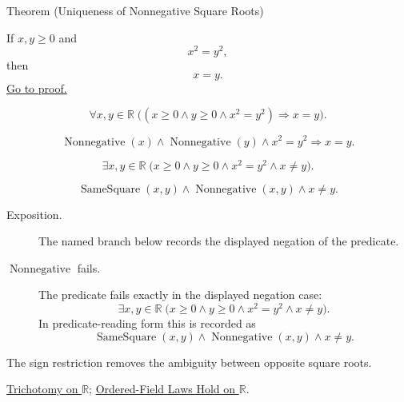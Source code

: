 \begin{theorembox}{Theorem (Uniqueness of Nonnegative Square Roots)}
\begin{theorem}
\label{thm:uniqueness-of-nonnegative-square-roots}
If $x,y\ge 0$ and
\[
x^2=y^2,
\]
then
\[
x=y.
\]
\hyperref[prf:uniqueness-of-nonnegative-square-roots]{Go to proof.}
\end{theorem}
\end{theorembox}
\begin{remark*}
\[
\forall x,y\in\mathbb{R}\;
\bigl((x\ge 0\land y\ge 0\land x^2=y^2)\Rightarrow x=y\bigr).
\]
\end{remark*}
\begin{remark*}
\[
\operatorname{Nonnegative}(x)\land\operatorname{Nonnegative}(y)\land x^2=y^2
\Rightarrow x=y.
\]
\end{remark*}
\begin{remark*}
\[
\exists x,y\in\mathbb{R}\;
\bigl(x\ge 0\land y\ge 0\land x^2=y^2\land x\ne y\bigr).
\]
\end{remark*}
\begin{remark*}
\[
\operatorname{SameSquare}(x,y)\land\operatorname{Nonnegative}(x,y)\land x\ne y.
\]
\end{remark*}

\begin{remark*}
\begin{description}
  \item[Exposition.] The named branch below records the displayed negation of the predicate.
  \item[\(\operatorname{Nonnegative}\) fails.] The predicate fails exactly in the displayed negation case:
  \[
  \exists x,y\in\mathbb{R}\;
  \bigl(x\ge 0\land y\ge 0\land x^2=y^2\land x\ne y\bigr).
  \]
  In predicate-reading form this is recorded as
  \[
  \operatorname{SameSquare}(x,y)\land\operatorname{Nonnegative}(x,y)\land x\ne y.
  \]
\end{description}
\end{remark*}
\begin{remark*}[Interpretation]
The sign restriction removes the ambiguity between opposite square roots.
\end{remark*}
\begin{dependencies}
\hyperref[thm:trichotomy-on-r]{Trichotomy on $\mathbb{R}$};
\hyperref[cor:ordered-field-laws-on-r]{Ordered-Field Laws Hold on $\mathbb{R}$}.
\end{dependencies}

